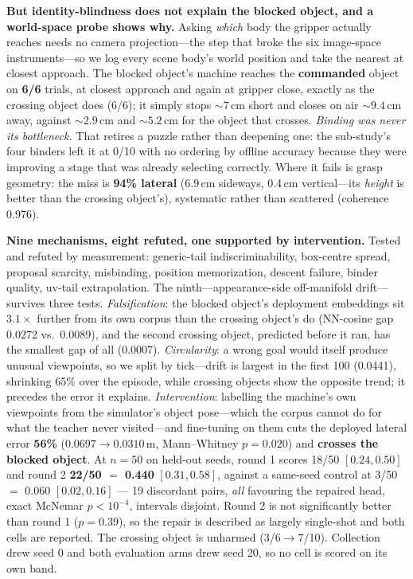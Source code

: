 \documentclass[10pt,letterpaper]{article}
\begin{document}
\noindent \textbf{But identity-blindness does not explain the blocked object,
and a world-space probe shows why.} Asking \emph{which} body the gripper
actually reaches needs no camera projection---the step that broke the six
image-space instruments---so we log every scene body's world position and take
the nearest at closest approach. The blocked object's machine reaches the
\textbf{commanded} object on \textbf{6/6} trials, at closest approach and again
at gripper close, exactly as the crossing object does (6/6); it simply stops
${\sim}7$\,cm short and closes on air ${\sim}9.4$\,cm away, against
${\sim}2.9$\,cm and ${\sim}5.2$\,cm for the object that crosses. \emph{Binding
was never its bottleneck.} That retires a puzzle rather than deepening one: the
sub-study's four binders left it at 0/10 with no ordering by offline accuracy
because they were improving a stage that was already selecting correctly.
Where it fails is grasp geometry: the miss is \textbf{94\% lateral} (6.9\,cm
sideways, 0.4\,cm vertical---its \emph{height} is better than the crossing
object's), systematic rather than scattered (coherence 0.976).

\noindent \textbf{Nine mechanisms, eight refuted, one supported by
intervention.} Tested and refuted by measurement: generic-tail
indiscriminability, box-centre spread, proposal scarcity, misbinding, position
memorization, descent failure, binder quality, uv-tail extrapolation. The
ninth---appearance-side off-manifold drift---survives three tests.
\emph{Falsification}: the blocked object's deployment embeddings sit
$3.1\times$ further from its own corpus than the crossing object's do
(NN-cosine gap 0.0272 vs.\ 0.0089), and the second crossing object, predicted
before it ran, has the smallest gap of all (0.0007). \emph{Circularity}: a
wrong goal would itself produce unusual viewpoints, so we split by tick---drift
is largest in the first 100 (0.0441), shrinking 65\% over the episode, while
crossing objects show the opposite trend; it precedes the error it explains.
\emph{Intervention}: labelling the machine's own viewpoints from the
simulator's object pose---which the corpus cannot do for what the teacher never
visited---and fine-tuning on them cuts the deployed lateral error \textbf{56\%}
($0.0697\to0.0310$\,m, Mann--Whitney $p{=}0.020$) and \textbf{crosses the
blocked object}. At $n{=}50$ on held-out seeds, round 1 scores 18/50 $[0.24,0.50]$
and round 2 \textbf{22/50 $=$ 0.440} $[0.31,0.58]$, against a same-seed control
at 3/50 $=$ 0.060 $[0.02,0.16]$ --- 19 discordant pairs, \emph{all} favouring
the repaired head, exact McNemar $p<10^{-4}$, intervals disjoint. Round 2 is not
significantly better than round 1 ($p{=}0.39$), so the repair is described as
largely single-shot and both cells are reported. The
crossing object is unharmed (3/6$\to$7/10). Collection drew seed 0 and both
evaluation arms drew seed 20, so no cell is scored on its own band.
\end{document}

